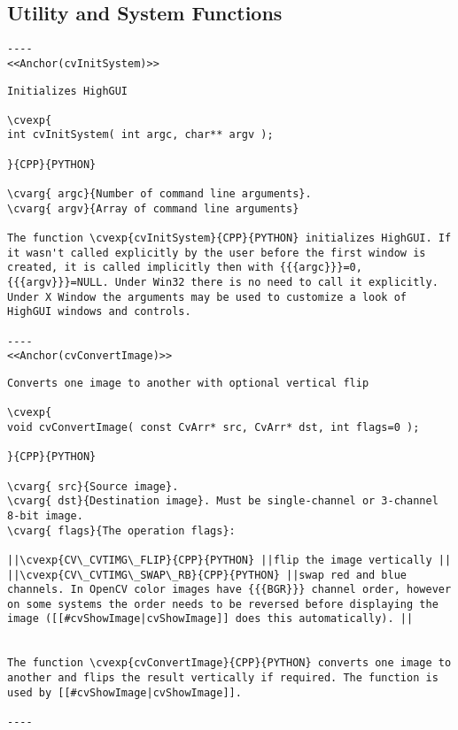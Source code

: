 \subsection{Utility and System Functions}
\begin{verbatim}
----
<<Anchor(cvInitSystem)>>
\end{verbatim}
\begin{verbatim}
Initializes HighGUI

\cvexp{
int cvInitSystem( int argc, char** argv );

}{CPP}{PYTHON}

\cvarg{ argc}{Number of command line arguments}.
\cvarg{ argv}{Array of command line arguments}

The function \cvexp{cvInitSystem}{CPP}{PYTHON} initializes HighGUI. If it wasn't called explicitly by the user before the first window is created, it is called implicitly then with {{{argc}}}=0, {{{argv}}}=NULL. Under Win32 there is no need to call it explicitly. Under X Window the arguments may be used to customize a look of HighGUI windows and controls.

----
<<Anchor(cvConvertImage)>>
\end{verbatim}
\begin{verbatim}
Converts one image to another with optional vertical flip

\cvexp{
void cvConvertImage( const CvArr* src, CvArr* dst, int flags=0 );

}{CPP}{PYTHON}

\cvarg{ src}{Source image}.
\cvarg{ dst}{Destination image}. Must be single-channel or 3-channel 8-bit image.
\cvarg{ flags}{The operation flags}:

||\cvexp{CV\_CVTIMG\_FLIP}{CPP}{PYTHON} ||flip the image vertically ||
||\cvexp{CV\_CVTIMG\_SWAP\_RB}{CPP}{PYTHON} ||swap red and blue channels. In OpenCV color images have {{{BGR}}} channel order, however on some systems the order needs to be reversed before displaying the image ([[#cvShowImage|cvShowImage]] does this automatically). ||


The function \cvexp{cvConvertImage}{CPP}{PYTHON} converts one image to another and flips the result vertically if required. The function is used by [[#cvShowImage|cvShowImage]].

----
\end{verbatim}
